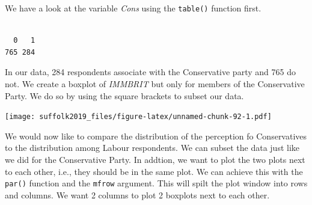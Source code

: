 \documentclass[]{article}
\newenvironment{Shaded}{\begin{snugshade}}{\end{snugshade}}
\newcommand{\CommentTok}[1]{\textcolor[rgb]{0.56,0.35,0.01}{\textit{#1}}}
\newcommand{\DataTypeTok}[1]{\textcolor[rgb]{0.13,0.29,0.53}{#1}}
\newcommand{\DecValTok}[1]{\textcolor[rgb]{0.00,0.00,0.81}{#1}}
\newcommand{\KeywordTok}[1]{\textcolor[rgb]{0.13,0.29,0.53}{\textbf{#1}}}
\newcommand{\NormalTok}[1]{#1}
\newcommand{\OperatorTok}[1]{\textcolor[rgb]{0.81,0.36,0.00}{\textbf{#1}}}
\newcommand{\OtherTok}[1]{\textcolor[rgb]{0.56,0.35,0.01}{#1}}
\newcommand{\StringTok}[1]{\textcolor[rgb]{0.31,0.60,0.02}{#1}}
\begin{document}
We have a look at the variable \emph{Cons} using the \texttt{table()} function first.

\begin{Shaded}
\end{Shaded}

\begin{verbatim}

  0   1 
765 284 
\end{verbatim}

In our data, 284 respondents associate with the Conservative party and 765 do not. We create a boxplot of \emph{IMMBRIT} but only for members of the Conservative Party. We do so by using the square brackets to subset our data.

\begin{Shaded}
\end{Shaded}

\texttt{[image: suffolk2019\_files/figure-latex/unnamed-chunk-92-1.pdf]}

We would now like to compare the distribution of the perception fo Conservatives to the distribution among Labour respondents. We can subset the data just like we did for the Conservative Party. In addtion, we want to plot the two plots next to each other, i.e., they should be in the same plot. We can achieve this with the \texttt{par()} function and the \texttt{mfrow} argument. This will spilt the plot window into rows and columns. We want 2 columns to plot 2 boxplots next to each other.
\end{document}
